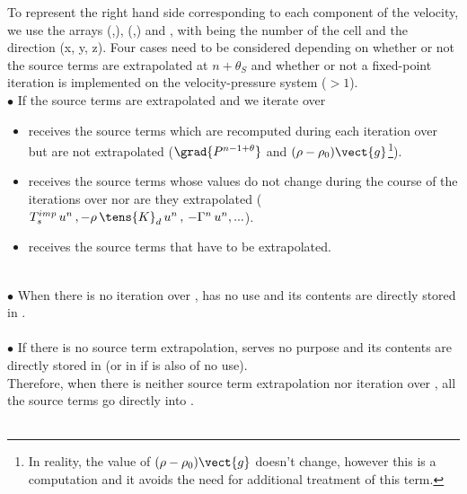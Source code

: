 To represent the right hand side corresponding to each component of the velocity, we use the arrays (,), (,) and , with  being the number of the cell and  the direction (x, y, z). Four cases need to be considered depending on whether or not the source terms are extrapolated at $n+\theta_S$ and whether or not a fixed-point iteration is implemented on the velocity-pressure system ($>1$).
\\
$\bullet$ If the source terms are extrapolated and we iterate over \\
\begin{itemize}
\item [-] receives the source terms which are recomputed during each iteration over  but are not extrapolated
($\grad{P^{n-1+\theta}}$ and $(\rho -\rho_0) \vect {g}$\footnote{In reality, the value of
$(\rho -\rho_0) \vect {g}$ doesn't change, however this is a computation and it avoids the need for additional treatment of this term.}).\\
\item [-] receives the source terms whose values do not change during the course of the iterations over  nor are they extrapolated
($T_s^{imp}\,u^n\,,-\rho\,\tens{K}_{d}\,u^n\,,\,-\Gamma^n\,u^n,...$).\\
\item [-] receives the source terms that have to be extrapolated.\\
\\
\end{itemize}
$\bullet$ When there is no iteration over ,  has no use and its contents are directly stored in .\\
\\
$\bullet$ If there is no source term extrapolation,  serves no purpose and its contents are directly stored in  (or in  if  is also of no use).\\
Therefore, when there is neither source term extrapolation nor iteration over , all the source terms go directly into .\\
\\
